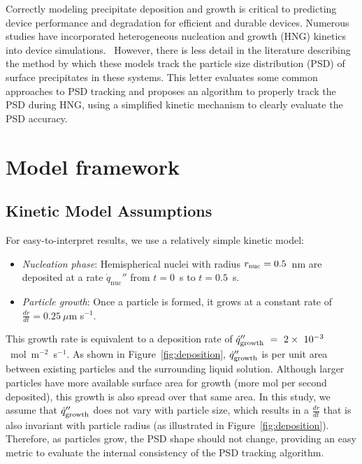 \documentclass[final,3p,times,twocolumn, 12pt]{elsarticle}
\begin{document}
Correctly modeling precipitate deposition and  growth is critical to predicting device performance and degradation for efficient and durable devices. Numerous studies have incorporated heterogeneous nucleation and growth (HNG) kinetics into device simulations.~\cite{bib:Model_ex_1,bib:Model_ex_2,bib:Model_ex_3,bib:Model_ex_4,bib:Model_ex_5,bib:Model_ex_6, bib:Model_ex_7, bib:Model_ex_8,bib:Model_ex_9, bib:Model_ex_10} However, there is less detail in the literature describing the method by which these models track the particle size distribution (PSD) of surface precipitates in these systems. This letter evaluates some common approaches to PSD tracking and proposes an algorithm to properly track the PSD during HNG, using a simplified kinetic mechanism to clearly evaluate the PSD accuracy. 

\section{Model framework}
\label{sect:model-framework}
\subsection{Kinetic Model Assumptions}
For easy-to-interpret results, we use a relatively simple kinetic model:
\begin{itemize}
    \item \emph{Nucleation phase}: Hemispherical nuclei with radius $r_{\rm nuc}=0.5$~nm are deposited at a rate $\dot{q}_\mathrm{nuc}''$ from $t = 0$~s to $t = 0.5$~s.
    \item \emph{Particle growth}: Once a particle is formed, it grows at a constant rate of $\frac{dr}{dt} = 0.25~\mu$m s$^{-1}$.
\end{itemize}
This growth rate is equivalent to a deposition rate of $\dot{q}_{\rm growth}^{\prime\prime}~=~2\times~10^{-3}$~mol~m$^{-2}$~s$^{-1}$. As shown in Figure~\ref{fig:deposition}, $\dot{q}_{\rm growth}^{\prime\prime}$ is per unit area between existing particles and the surrounding liquid solution. Although larger particles have more available surface area for growth (more mol per second deposited), this growth is also spread over that same area. In this study, we assume that $\dot{q}_{\rm growth}^{\prime\prime}$ does not vary with particle size, which results in a $\frac{dr}{dt}$ that is also invariant with particle radius (as illustrated in Figure~\ref{fig:deposition}). Therefore, as particles grow, the PSD shape should not change, providing an easy metric to evaluate the internal consistency of the PSD tracking algorithm.
\end{document}
